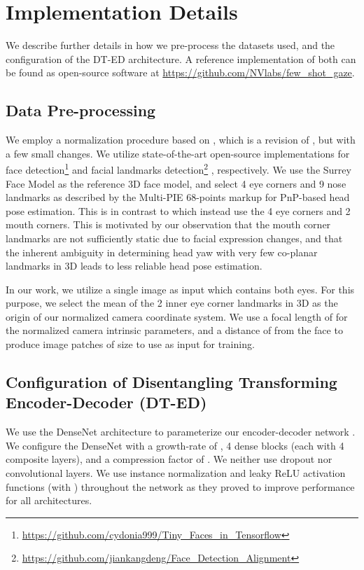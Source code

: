 \documentclass[10pt,twocolumn,letterpaper]{article}
\begin{document}
\section{Implementation Details}
\noindent
We describe further details in how we pre-process the datasets used, and the configuration of the DT-ED architecture.
A reference implementation of both can be found as open-source software at \url{https://github.com/NVlabs/few_shot_gaze}.

\subsection{Data Pre-processing\label{sec:pre-processing}}
\noindent
We employ a normalization procedure based on \cite{Zhang2018ETRA}, which is a revision of \cite{Sugano2014CVPR}, but with a few small changes. We utilize state-of-the-art open-source implementations for face detection\footnote{\tiny\url{https://github.com/cydonia999/Tiny_Faces_in_Tensorflow}} \cite{Hu2017CVPR} and facial landmarks detection\footnote{\tiny\url{https://github.com/jiankangdeng/Face_Detection_Alignment}} \cite{Deng2018FG}, respectively.
 We use the Surrey Face Model \cite{Huber2016} as the reference 3D face model, and select 4 eye corners and 9 nose landmarks as described by the Multi-PIE 68-points markup \cite{Gross2010} for PnP-based \cite{lepetit2009epnp} head pose estimation. This is in contrast to \cite{Sugano2014CVPR,Zhang2018ETRA} which instead use the 4 eye corners and 2 mouth corners. This is motivated by our observation that the mouth corner landmarks are not sufficiently static due to facial expression changes, and that the inherent ambiguity in determining head yaw with very few co-planar landmarks in 3D leads to less reliable head pose estimation.

In our work, we utilize a single image as input which contains both eyes. For this purpose, we select the mean of the 2 inner eye corner landmarks in 3D as the origin of our normalized camera coordinate system.
We use a focal length of  for the normalized camera intrinsic parameters, and a distance of  from the face to produce image patches of size  to use as input for training.

\subsection{Configuration of Disentangling Transforming Encoder-Decoder (DT-ED)}
\noindent
We use the DenseNet architecture to parameterize our encoder-decoder network \cite{Huang2017CVPR}.
We configure the DenseNet with a growth-rate of , 4 dense blocks (each with 4 composite layers), and a compression factor of . We neither use dropout nor  convolutional layers.
We use instance normalization \cite{Ulyanov2016arXiv} and leaky ReLU activation functions (with ) throughout the network as they proved to improve performance for all architectures.
\end{document}
